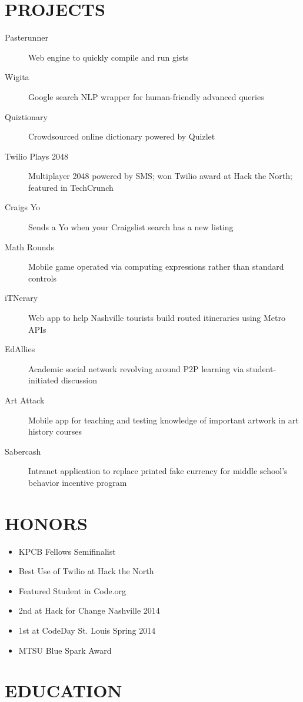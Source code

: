 \documentclass{res}
\begin{document}
\section{PROJECTS}

\begin{description}
  \item[Pasterunner] Web engine to quickly compile and run gists
  \item[Wigita] Google search NLP wrapper for human-friendly advanced queries
  \item[Quiztionary] Crowdsourced online dictionary powered by Quizlet
  \item[Twilio Plays 2048] Multiplayer 2048 powered by SMS; won Twilio award at Hack the North; featured in TechCrunch
  \item[Craigs Yo] Sends a Yo when your Craigslist search has a new listing
  \item[Math Rounds] Mobile game operated via computing expressions rather than standard controls
  \item[iTNerary] Web app to help Nashville tourists build routed itineraries using Metro APIs
  \item[EdAllies] Academic social network revolving around P2P learning via student-initiated discussion
  \item[Art Attack] Mobile app for teaching and testing knowledge of important artwork in art history courses
  \item[Sabercash] Intranet application to replace printed fake currency for middle school's behavior incentive program
\end{description}

\section{HONORS}

\begin{itemize}
  \item KPCB Fellows Semifinalist
  \item Best Use of Twilio at Hack the North
  \item Featured Student in Code.org
  \item 2nd at Hack for Change Nashville 2014
  \item 1st at CodeDay St. Louis Spring 2014
  \item MTSU Blue Spark Award
\end{itemize}

\section{EDUCATION}
\end{document}
